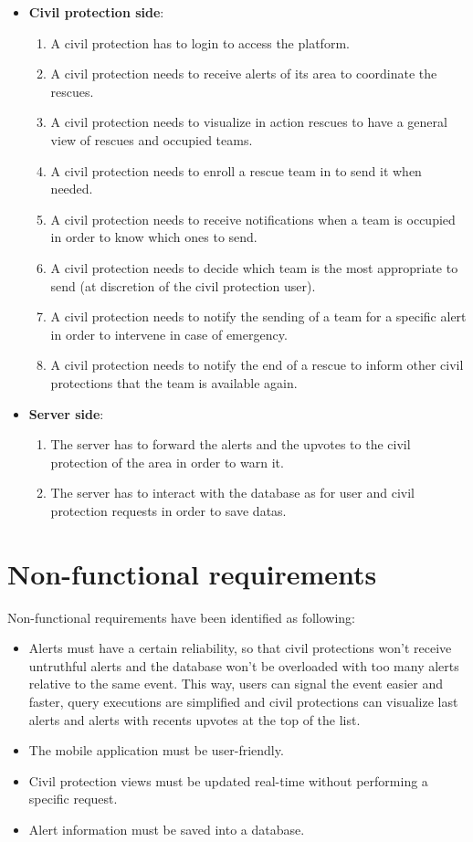 \documentclass[a4paper,12pt]{report}
\begin{document}
\begin{itemize}
\item \textbf{Civil protection side}:
\begin{enumerate}
\item A civil protection has to login to access the platform.
\item A civil protection needs to receive alerts of its area to coordinate the rescues.
\item A civil protection needs to visualize in action rescues to have a general view of rescues and occupied teams.
\item A civil protection needs to enroll a rescue team in to send it when needed.
\item A civil protection needs to receive notifications when a team is occupied in order to know which ones to send.
\item A civil protection needs to decide which team is the most appropriate to send (at discretion of the civil protection user).
\item A civil protection needs to notify the sending of a team for a specific alert in order to intervene in case of emergency.
\item A civil protection needs to notify the end of a rescue to inform other civil protections that the team is available again.
\end{enumerate}
\end{itemize}

\begin{itemize}
\item \textbf{Server side}:
\begin{enumerate}
\item The server has to forward the alerts and the upvotes to the civil protection of the area in order to warn it.
\item The server has to interact with the database as for user and civil protection requests in order to save datas. 
\end{enumerate}
\end{itemize}

\section{Non-functional requirements}

Non-functional requirements have been identified as following:

\begin{itemize}
\item Alerts must have a certain reliability, so that civil protections won't receive untruthful alerts and the database won't be overloaded with too many alerts relative to the same event. This way, users can signal the event easier and faster, query executions are simplified and civil protections can visualize last alerts and alerts with recents upvotes at the top of the list.
\item The mobile application must be user-friendly.
\item Civil protection views must be updated real-time without performing a specific request.
\item Alert information must be saved into a database.
\end{itemize} 
\end{document}
